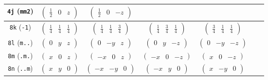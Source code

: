 \documentclass[fleqn,9pt,landscape]{jsarticle}
\begin{document}
\begin{center}
\begin{longtable}{ccccccc}
{\tt 4j} ({\tt mm2}) & $ \begin{pmatrix} \frac{1}{2} & 0 & z \end{pmatrix} $ & $ \begin{pmatrix} \frac{1}{2} & 0 & - z \end{pmatrix} $ & $  $ & $  $ & $  $ & $  $ \\ \hline
{\tt 8k} ({\tt -1}) & $ \begin{pmatrix} \frac{1}{4} & \frac{1}{4} & \frac{1}{4} \end{pmatrix} $ & $ \begin{pmatrix} \frac{1}{4} & \frac{1}{4} & \frac{3}{4} \end{pmatrix} $ & $ \begin{pmatrix} \frac{1}{4} & \frac{3}{4} & \frac{1}{4} \end{pmatrix} $ & $ \begin{pmatrix} \frac{3}{4} & \frac{1}{4} & \frac{1}{4} \end{pmatrix} $ & $  $ & $  $ \\ \hline
{\tt 8l} ({\tt m..}) & $ \begin{pmatrix} 0 & y & z \end{pmatrix} $ & $ \begin{pmatrix} 0 & - y & z \end{pmatrix} $ & $ \begin{pmatrix} 0 & y & - z \end{pmatrix} $ & $ \begin{pmatrix} 0 & - y & - z \end{pmatrix} $ & $  $ & $  $ \\ \hline
{\tt 8m} ({\tt .m.}) & $ \begin{pmatrix} x & 0 & z \end{pmatrix} $ & $ \begin{pmatrix} - x & 0 & z \end{pmatrix} $ & $ \begin{pmatrix} - x & 0 & - z \end{pmatrix} $ & $ \begin{pmatrix} x & 0 & - z \end{pmatrix} $ & $  $ & $  $ \\ \hline
{\tt 8n} ({\tt ..m}) & $ \begin{pmatrix} x & y & 0 \end{pmatrix} $ & $ \begin{pmatrix} - x & - y & 0 \end{pmatrix} $ & $ \begin{pmatrix} - x & y & 0 \end{pmatrix} $ & $ \begin{pmatrix} x & - y & 0 \end{pmatrix} $ & $  $ & $  $ \\ \hline

\end{longtable}
\end{center}
\end{document}
